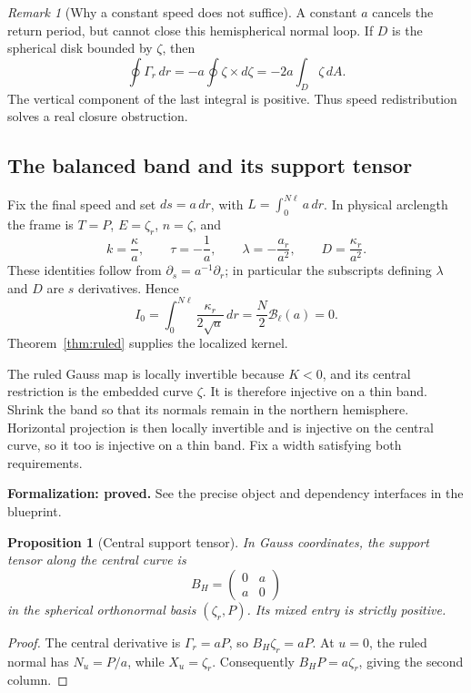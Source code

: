 \documentclass[11pt]{amsart}
\newtheorem{proposition}[theorem]{Proposition}
\theoremstyle{definition}
\theoremstyle{remark}
\newtheorem{remark}[theorem]{Remark}
\numberwithin{equation}{section}
\begin{document}
\begin{remark}[Why a constant speed does not suffice]\label{rem:constant-speed-obstruction}
A constant $a$ cancels the return period, but cannot close this
hemispherical normal loop. If $D$ is the spherical disk bounded by
$\zeta$, then
\[
 \oint\Gamma_r\,dr=-a\oint\zeta\times d\zeta
 =-2a\int_D\zeta\,dA.
\]
The vertical component of the last integral is positive. Thus speed
redistribution solves a real closure obstruction.
\end{remark}

\subsection{The balanced band and its support tensor}
Fix the final speed and set $ds=a\,dr$, with
$L=\int_0^{N\ell}a\,dr$. In physical arclength the frame is
$T=P$, $E=\zeta_r$, $n=\zeta$, and
\begin{equation}\label{eq:frame-speed}
 k=\frac\kappa a,\qquad \tau=-\frac1a,\qquad
 \lambda=-\frac{a_r}{a^2},\qquad D=\frac{\kappa_r}{a^2}.
\end{equation}
These identities follow from $\partial_s=a^{-1}\partial_r$; in particular
the subscripts defining $\lambda$ and $D$ are $s$ derivatives. Hence
\[
 I_0=\int_0^{N\ell}\frac{\kappa_r}{2\sqrt a}\,dr
 =\frac N2\mathscr B_\ell(a)=0.
\]
Theorem~\ref{thm:ruled} supplies the localized kernel.

The ruled Gauss map is locally invertible because $K<0$, and its central
restriction is the embedded curve $\zeta$. It is therefore injective on
a thin band. Shrink the band so that its normals remain in the northern
hemisphere. Horizontal projection is then locally invertible and is
injective on the central curve, so it too is injective on a thin band.
Fix a width satisfying both requirements.

\par\noindent\textbf{Formalization: proved.} See the precise object and dependency interfaces in the blueprint.\par
\begin{proposition}[Central support tensor]\label{prop:central-support}
In Gauss coordinates, the support tensor along the central curve is
\begin{equation}\label{eq:central-B}
 B_H=\begin{pmatrix}0&a\\a&0\end{pmatrix}
\end{equation}
in the spherical orthonormal basis $(\zeta_r,P)$. Its mixed entry is
strictly positive.
\end{proposition}
\begin{proof}
The central derivative is $\Gamma_r=aP$, so $B_H\zeta_r=aP$.
At $u=0$, the ruled normal has $N_u=P/a$, while $X_u=\zeta_r$.
Consequently $B_HP=a\zeta_r$, giving the second column.
\end{proof}
\end{document}
